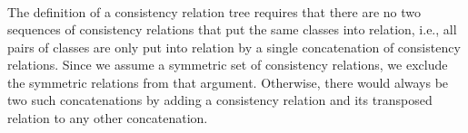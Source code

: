 \begin{definition}
\begin{align*}
    \end{align*}
\end{definition}

The definition of a consistency relation tree requires that there are no two sequences of consistency relations that put the same classes into relation, i.e., all pairs of classes are only put into relation by a single concatenation of consistency relations.
Since we assume a symmetric set of consistency relations, we exclude the symmetric relations from that argument.
Otherwise, there would always be two such concatenations by adding a consistency relation and its transposed relation to any other concatenation.

